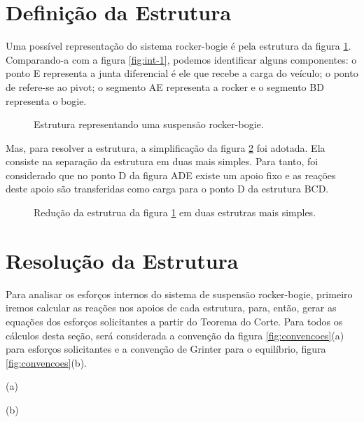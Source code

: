 \documentclass[12pt]{article}
\begin{document}
\section{Definição da Estrutura}

Uma possível representação do sistema rocker-bogie é pela estrutura da figura \ref{fig:diagrama-base}. Comparando-a com a figura \ref{fig:int-1}, podemos identificar alguns componentes: o ponto E representa a junta diferencial é ele que recebe a carga do veículo; o ponto de refere-se ao pivot; o segmento AE representa a rocker e o segmento BD representa o bogie.

\begin{figure}[h!]
  \centering
  \resizebox{.6\textwidth}{!}{}
  \smallskip
  \caption{Estrutura representando uma suspensão rocker-bogie.}
  \label{fig:diagrama-base}
\end{figure}

Mas, para resolver a estrutura, a simplificação da figura \ref{fig:diagrama-simpl} foi adotada. Ela consiste na separação da estrutura em duas mais simples. Para tanto, foi considerado que no ponto D da figura ADE existe um apoio fixo e as reações deste apoio são transferidas como carga para o ponto D da estrutura BCD.

\begin{figure}[h!]
  \centering
  \resizebox{.7\textwidth}{!}{}
  \smallskip
  \caption{Redução da estrutrua da figura \ref{fig:diagrama-base} em duas estrutras mais simples.}
  \label{fig:diagrama-simpl}
\end{figure}

\pagebreak

\section{Resolução da Estrutura}

\begin{minipage}{.48\textwidth}
  Para analisar os esforços internos do sistema de suspensão rocker-bogie, primeiro iremos calcular as reações nos apoios de cada estrutura, para, então, gerar as equações dos esforços solicitantes a partir do Teorema do Corte. Para todos os cálculos desta seção, será considerada a convenção da figura \ref{fig:convencoes}(a) para esforços solicitantes e a convenção de Grinter para o equilíbrio, figura \ref{fig:convencoes}(b).
  \end{minipage}%
\hfill%
\begin{minipage}{.45\textwidth}
  \begin{minipage}{.7\textwidth}
    \centering
    \resizebox{\linewidth}{!}{}
    (a)
  \end{minipage}%
  \hfill%
  \begin{minipage}{.25\textwidth}
    \centering
    \resizebox{\linewidth}{!}{}
    (b)
  \end{minipage}
  \label{fig:convencoes}
\end{minipage}
\end{document}
